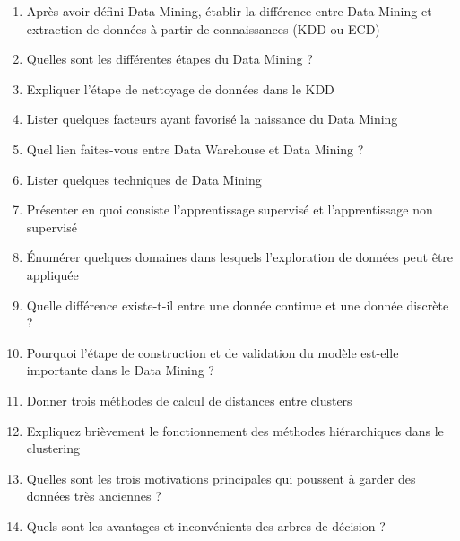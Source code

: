 \documentclass[a4paper,14pt]{article}
\begin{document}
    \begin{enumerate}[leftmargin=*]
        \item Après avoir défini Data Mining, établir la différence entre Data Mining et extraction de données à partir de connaissances (KDD ou ECD)
        
        \item Quelles sont les différentes étapes du Data Mining ?
        
        \item Expliquer l'étape de nettoyage de données dans le KDD
        
        \item Lister quelques facteurs ayant favorisé la naissance du Data Mining
        
        \item Quel lien faites-vous entre Data Warehouse et Data Mining ?
        
        \item Lister quelques techniques de Data Mining
        
        \item Présenter en quoi consiste l'apprentissage supervisé et l'apprentissage non supervisé
        
        \item Énumérer quelques domaines dans lesquels l'exploration de données peut être appliquée
        
        \item Quelle différence existe-t-il entre une donnée continue et une donnée discrète ?
        
        \item Pourquoi l'étape de construction et de validation du modèle est-elle importante dans le Data Mining ?
        
        \item Donner trois méthodes de calcul de distances entre clusters
        
        \item Expliquez brièvement le fonctionnement des méthodes hiérarchiques dans le clustering
        
        \item Quelles sont les trois motivations principales qui poussent à garder des données très anciennes ?
        
        \item Quels sont les avantages et inconvénients des arbres de décision ?
        
    \end{enumerate}
\end{document}
